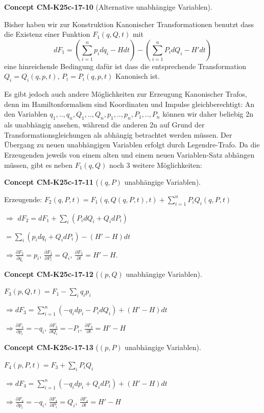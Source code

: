 \documentclass[10pt, letterpaper]{article}
\newcommand{\CustomHeading}[3]{%
  \par\medskip\noindent%
  \textbf{#1 #2} \textnormal{(#3)}.\enskip%
}
\newenvironment{CONC}[2]{\CustomHeading{Concept}{#1}{#2}}{}
\begin{document}
\begin{CONC}{CM-K25c-17-10}{Alternative unabhängige Variablen}
Bisher haben wir zur Konstruktion Kanonischer Transformationen benutzt dass die Existenz einer Funktion $F_1(q,Q,t)$ mit
\[dF_1 = \left(\sum_{i=1}^n p_i dq_i - H dt\right) - \left(\sum_{i=1}^n P_i dQ_i - H' dt\right)\]
eine hinreichende Bedingung dafür ist dass die entsprechende Transformation $Q_i = Q_i(q,p,t)$, $P_i = P_i(q,p,t)$ Kanonisch ist.

Es gibt jedoch auch andere Möglichkeiten zur Erzeugung Kanonischer Trafos, denn im Hamiltonformalism sind Koordinaten und Impulse gleichberechtigt: An den Variablen $q_1,..,q_n,Q_1,..,Q_n,p_1,..,p_n,P_1,..,P_n$ können wir daher beliebig 2n als unabhängig ansehen, während die anderen 2n auf Grund der Transformationsgleichungen als abhängig betrachtet werden müssen. Der Übergang zu neuen unabhängigen Variablen erfolgt durch Legendre-Trafo. Da die Erzeugenden jeweils von einem alten und einem neuen Variablen-Satz abhängen müssen, gibt es neben $F_1(q,Q)$ noch 3 weitere Möglichkeiten:
\end{CONC}

\begin{CONC}{CM-K25c-17-11}{$(q,P)$ unabhängige Variablen}
Erzeugende: $F_2(q,P,t) = F_1(q,Q(q,P,t),t) + \sum_{i=1}^n P_i Q_i(q,P,t)$

$\Rightarrow$ $dF_2 = dF_1 + \sum_i (P_i dQ_i + Q_i dP_i)$

$= \sum_i (p_i dq_i + Q_i dP_i) - (H'-H)dt$

$\Rightarrow \frac{\partial F_2}{\partial q_i} = p_i$, $\frac{\partial F_2}{\partial P_i} = Q_i$, $\frac{\partial F_2}{\partial t} = H'-H$.
\end{CONC}

\begin{CONC}{CM-K25c-17-12}{$(p,Q)$ unabhängige Variablen}
$F_3(p,Q,t) = F_1 - \sum_i q_i p_i$

$\Rightarrow dF_3 = \sum_{i=1}^n (-q_i dp_i - P_i dQ_i) + (H'-H)dt$

$\Rightarrow \frac{\partial F_3}{\partial p_i} = -q_i$, $\frac{\partial F_3}{\partial Q_i} = -P_i$, $\frac{\partial F_3}{\partial t} = H'-H$
\end{CONC}

\begin{CONC}{CM-K25c-17-13}{$(p,P)$ unabhängige Variablen}
$F_4(p,P,t) = F_3 + \sum_i P_i Q_i$

$\Rightarrow dF_4 = \sum_{i=1}^n (-q_i dp_i + Q_i dP_i) + (H'-H)dt$

$\Rightarrow \frac{\partial F_4}{\partial p_i} = -q_i$, $\frac{\partial F_4}{\partial P_i} = Q_i$, $\frac{\partial F_4}{\partial t} = H'-H$
\end{CONC}
\end{document}
